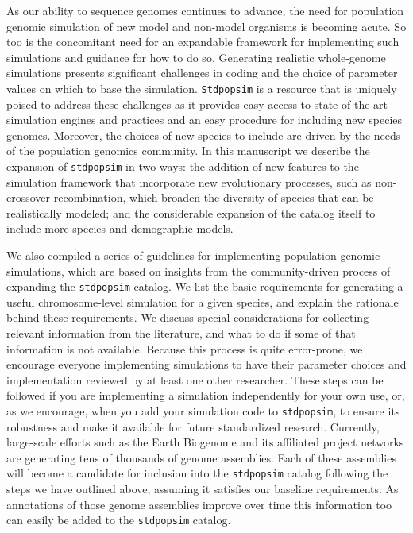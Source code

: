 \documentclass[hidelinks]{article}
\newcommand{\Stdpopsim}{\texttt{Stdpopsim}\xspace}
\newcommand{\stdpopsim}{\texttt{stdpopsim}\xspace}
\begin{document}
As our ability to sequence genomes continues to advance, the need for
population genomic simulation of new model and non-model organisms is becoming acute.
So too is the concomitant need for an expandable framework for implementing such simulations and guidance for how to do so.
Generating realistic whole-genome simulations presents significant challenges
in coding and the choice of parameter values on which to base the simulation.
\Stdpopsim is a resource that is uniquely poised to address these 
challenges as it provides easy access to state-of-the-art simulation engines and practices and an easy procedure for including new species genomes.
Moreover, the choices of new species to include are driven by the
needs of the population genomics community. In this manuscript we 
describe the expansion of \stdpopsim in two ways:
the addition of new features to the simulation framework that incorporate new evolutionary processes,
such as non-crossover recombination, which broaden the diversity of species that can
be realistically modeled; and the considerable expansion of the catalog itself
to include more species and demographic models. 

We also compiled a series of guidelines for implementing
population genomic simulations, which are based on
insights from the community-driven process of expanding the \stdpopsim catalog.
We list the basic requirements for generating a useful chromosome-level simulation for a given species, and explain the rationale behind these requirements.
We discuss special considerations for collecting relevant information from the literature,
and what to do if some of that information is not available.
Because this process is quite error-prone,
we encourage everyone implementing simulations to have their
parameter choices and implementation reviewed by at least one other
researcher.
These steps can be followed if you are implementing a simulation independently for your own use,
or, as we encourage, when you add your simulation code to \stdpopsim,
to ensure its robustness and make it available for future standardized research.
Currently, large-scale efforts such as the Earth Biogenome
and its affiliated project networks are generating tens of thousands of genome
assemblies. Each of these assemblies
will become a candidate for inclusion into the
\stdpopsim catalog following the steps we have outlined above,
assuming it satisfies our baseline requirements.
As annotations of those genome assemblies improve over time this information too can easily be added to the \stdpopsim catalog.
\end{document}
